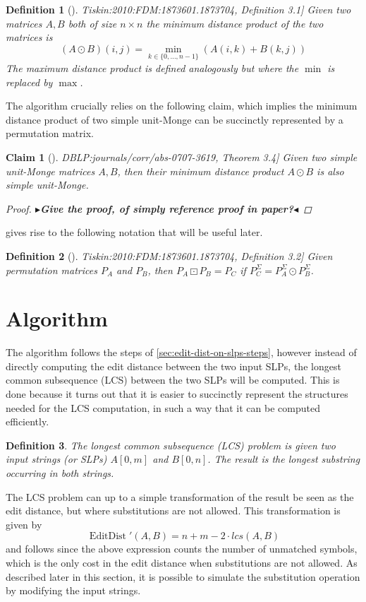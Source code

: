\documentclass[twoside,11pt,openright]{report}
\newcommand{\todo}[1]{{\color[rgb]{.5,0,0}\textbf{$\blacktriangleright$#1$\blacktriangleleft$}}}
\newcommand{\EditDist}{\operatorname{EditDist}}
\newcommand{\str}[3]{#1[#2, #3]}
\newcommand{\refbook}[2]{\cite[#1]{DBLP:journals/corr/abs-0707-3619}, #2}
\newcommand{\reftiskin}[2]{\cite[#1]{Tiskin:2010:FDM:1873601.1873704}, #2}
\newtheorem{mydef}{Definition}
\newtheorem{claim}{Claim}
\begin{document}
\begin{mydef}[\reftiskin{p. 1289}{Definition 3.1}]
  \label{def:minimum-distance-product}
  Given two matrices $A, B$ both of size $n \times n$ the minimum distance product of the two matrices is
  \[
    (A \odot B)(i, j) = \min_{k \in \{ 0, \dots, n - 1 \}} \left( A(i, k) + B(k, j) \right)
  \]
  The maximum distance product is defined analogously but where the $\min$ is replaced by $\max$.
\end{mydef}
The algorithm crucially relies on the following claim, which implies the minimum distance product of two simple unit-Monge can be succinctly represented by a permutation matrix.
\begin{claim}[\refbook{p. 16}{Theorem 3.4}]
  \label{claim:unit-monge-min-prod-closed}
  Given two simple unit-Monge matrices $A, B$, then their minimum distance product $A \odot B$ is also simple unit-Monge.
  \begin{proof}
    \todo{Give the proof, of simply reference proof in paper?}
  \end{proof}
\end{claim}
 gives rise to the following notation that will be useful later.
\begin{mydef}[\reftiskin{p. 1289}{Definition 3.2}]
  Given permutation matrices $P_A$ and $P_B$, then $P_A \boxdot P_B = P_C$ if $P_C^{\Sigma} = P_A^{\Sigma} \odot P_B^{\Sigma}$.
\end{mydef}

\section{Algorithm}
The algorithm follows the steps of \cref{sec:edit-dist-on-slps-steps}, however instead of directly computing the edit distance between the two input SLPs, the longest common subsequence (LCS) between the two SLPs will be computed. This is done because it turns out that it is easier to succinctly represent the structures needed for the LCS computation, in such a way that it can be computed efficiently.

\begin{mydef}
  The longest common subsequence (LCS) problem is given two input strings (or SLPs) $\str{A}{0}{m}$ and $\str{B}{0}{n}$. The result is the longest substring occurring in both strings.
\end{mydef}

The LCS problem can up to a simple transformation of the result be seen as the edit distance, but where substitutions are not allowed. This transformation is given by
\[
  \EditDist'(A, B) = n + m - 2 \cdot lcs(A, B)
\]
and follows since the above expression counts the number of unmatched symbols, which is the only cost in the edit distance when substitutions are not allowed. As described later in this section, it is possible to simulate the substitution operation by modifying the input strings.
\end{document}
